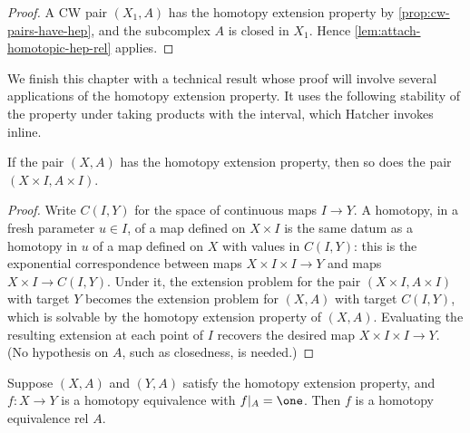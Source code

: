\begin{proof}
A CW pair $(X_1, A)$ has the homotopy extension property by
\cref{prop:cw-pairs-have-hep}, and the subcomplex $A$ is closed in $X_1$. Hence
\cref{lem:attach-homotopic-hep-rel} applies.
\end{proof}

We finish this chapter with a technical result whose proof will involve several
applications of the homotopy extension property. It uses the following stability of
the property under taking products with the interval, which Hatcher invokes inline.

\begin{lemma}
\label{lem:hep-product-interval}
\leanok
{}
If the pair $(X,A)$ has the homotopy extension property, then so does the pair
$(X \times I, A \times I)$.
\end{lemma}

\begin{proof}
\leanok
Write $C(I,Y)$ for the space of continuous maps $I \to Y$. A homotopy, in a fresh
parameter $u \in I$, of a map defined on $X \times I$ is the same datum as a homotopy
in $u$ of a map defined on $X$ with values in $C(I,Y)$: this is the exponential
correspondence between maps $X \times I \times I \to Y$ and maps $X \times I \to C(I,Y)$.
Under it, the extension problem for the pair $(X \times I, A \times I)$ with target $Y$
becomes the extension problem for $(X,A)$ with target $C(I,Y)$, which is solvable by the
homotopy extension property of $(X,A)$. Evaluating the resulting extension at each
point of $I$ recovers the desired map $X \times I \times I \to Y$. (No hypothesis on
$A$, such as closedness, is needed.)
\end{proof}

\begin{proposition}
\label{prop:hep-homotopy-equivalence-rel-a}
\leanok
{}
Suppose $(X,A)$ and $(Y,A)$ satisfy the homotopy extension property, and
$f : X \to Y$ is a homotopy equivalence with $f|_A = \one$. Then $f$ is a homotopy
equivalence rel $A$.
\end{proposition}

